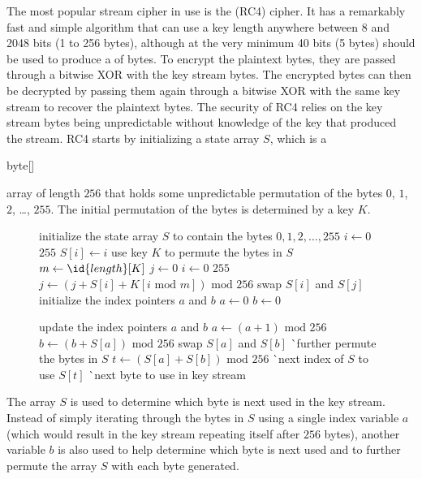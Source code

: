 The most popular stream cipher in use is the  (RC4) cipher.
It has a remarkably fast and simple algorithm that can use a key length anywhere
between 8 and 2048 bits (1 to 256 bytes), although at the very minimum 40 bits
(5 bytes) should be used to produce a  of bytes.
To encrypt the plaintext bytes, they are passed through a bitwise XOR with
the key stream bytes.
The encrypted bytes can then be decrypted by passing them again through a bitwise XOR
with the same key stream to recover the plaintext bytes.
The security of RC4 relies on the key stream bytes being unpredictable without
knowledge of the key that produced the stream.
RC4 starts by initializing a state array $S$, which is a \begin{code}byte[]\end{code}
array of length $256$ that holds some unpredictable permutation of the bytes
$0$, $1$, $2$, \dots, $255$. The initial permutation of the bytes is determined
by a key $K$.
\begin{figure*}[htb]
\begin{codebox}
\li \Comment initialize the state array $S$ to contain the bytes $0,1,2,\dots,255$
\li \For $i \gets 0$ \To $255$ \Do
\li    $S[i] \gets i$
    \End
\li \Comment use key $K$ to permute the bytes in $S$
\li $m \gets \id{length}[K]$
\li $j \gets 0$
\li \For $i \gets 0$ \To $255$ \Do
\li    $j \gets (j + S[i] + K[i \mbox{ mod } m]) \mbox{ mod } 256$
\li    swap $S[i]$ and $S[j]$
    \End
\li \Comment initialize the index pointers $a$ and $b$
\li $a \gets 0$
\li $b \gets 0$
\end{codebox}

\begin{codebox}
\li \Comment update the index pointers $a$ and $b$
\li $a \gets (a+1) \mbox{ mod } 256$
\li $b \gets (b+S[a]) \mbox{ mod } 256$
\li swap $S[a]$ and $S[b]$ \`\Comment further permute the bytes in $S$
\li $t \gets (S[a] + S[b]) \mbox{ mod } 256$ \`\Comment next index of $S$ to use
\li \Return $S[t]$ \`\Comment next byte to use in key stream
\end{codebox}
\end{figure*}
The array $S$ is used to determine which byte is next used in
the key stream. Instead of simply iterating through the bytes in $S$
using a single index variable $a$
(which would result in the key stream repeating itself after $256$ bytes),
another variable $b$ is also used to help determine which byte is next used
and to further permute the array $S$ with each byte generated.

